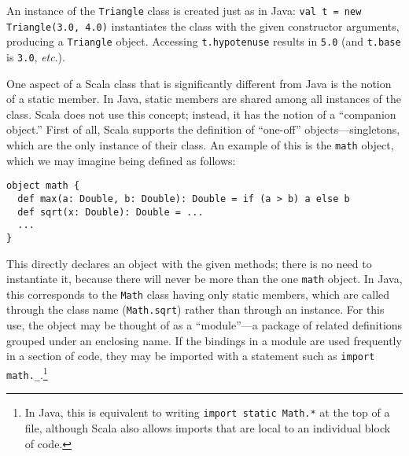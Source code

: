 An instance of the \texttt{Triangle} class is created just as in Java: \texttt{val t = new Triangle(3.0, 4.0)} instantiates the class with the given constructor arguments, producing a \texttt{Triangle} object. Accessing \texttt{t.hypotenuse} results in \texttt{5.0} (and \texttt{t.base} is \texttt{3.0}, \textit{etc}.).

One aspect of a Scala class that is significantly different from Java is the notion of a static member. In Java, static members are shared among all instances of the class. Scala does not use this concept; instead, it has the notion of a ``companion object.'' First of all, Scala supports the definition of ``one-off'' objects---singletons, which are the only instance of their class. An example of this is the \texttt{math} object, which we may imagine being defined as follows:
\begin{verbatim}
object math {
  def max(a: Double, b: Double): Double = if (a > b) a else b
  def sqrt(x: Double): Double = ...
  ...
}
\end{verbatim}
This directly declares an object with the given methods; there is no need to instantiate it, because there will never be more than the one \texttt{math} object. In Java, this corresponds to the \texttt{Math} class having only static members, which are called through the class name (\texttt{Math.sqrt}) rather than through an instance. For this use, the object may be thought of as a ``module''---a package of related definitions grouped under an enclosing name. If the bindings in a module are used frequently in a section of code, they may be imported with a statement such as \texttt{import math.\_}.\footnote{In Java, this is equivalent to writing \texttt{import static Math.*} at the top of a file, although Scala also allows imports that are local to an individual block of code.}

